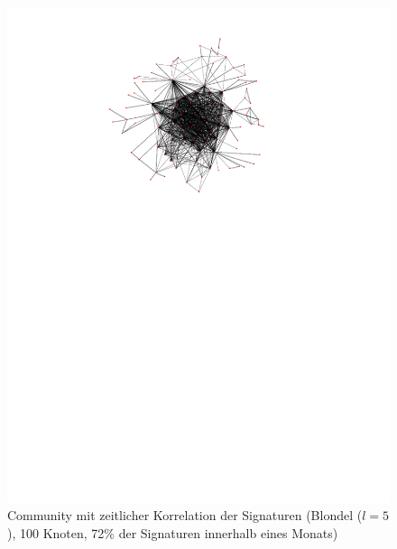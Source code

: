 \begin{figure}[th!]
  \centering
  \includegraphics[scale=1.5]{images/subgraph-label-time-fa62cc57cd35e9f90b85435efc407ad5.pdf}
  \caption{Community mit zeitlicher Korrelation der Signaturen
    (Blondel ($l=5$),
    100 Knoten, 72\% der Signaturen innerhalb eines Monats)}
  \label{fig:time-corr-com-normal}
\end{figure}


